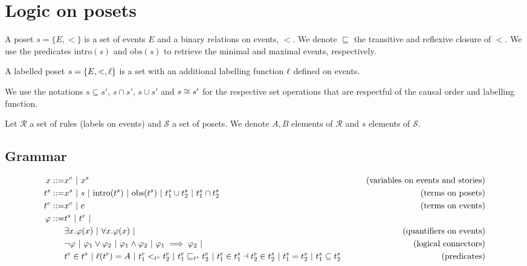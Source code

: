 \section{Logic on posets}

\begin{definition}[Poset]
  \label{def:poset}
  A poset $s=\{E,<\}$ is a set of events $E$ and a binary relations on events, $<$. We denote $\sqsubseteq$ the transitive and reflexive closure of $<$.
  We use the predicates $\text{intro}(s)$ and $\text{obs}(s)$ to retrieve the minimal and maximal events, respectively.

  A labelled poset $s=\{E,<,\ell\}$ is a set with an additional labelling function $\ell$ defined on events.
\end{definition}


We use the notations $s \subseteq s'$, $s\cap s'$, $s\cup s'$ and $s\cong s'$ for the respective set operations that are respectful of the causal order and labelling function.

Let $\mathcal{R}$ a set of rules (labels on events) and $\mathcal{S}$ a set of posets.
We denote $A,B$ elements of $\mathcal{R}$ and $s$ elements of $\mathcal{S}$.

\subsection{Grammar}

\begin{align*}
  x ::= & x^e ~|~ x^s & \tag{variables on events and stories} \\
  t^s ::= & x^s ~|~ s ~|~ \text{intro}(t^s) ~|~ \text{obs}(t^s) ~|~ t^s_1 \cup t^s_2 ~|~ t^s_1 \cap t^s_2 &\tag{terms on posets} \\
  t^e ::= & x^e ~|~ e & \tag{terms on events}
  \\
  \varphi ::= & t^s ~|~ t^e ~| \\
  & \exists x.\varphi(x) ~|~ \forall x.\varphi(x) ~|&\tag{quantifiers on events}\\
  & \neg \varphi ~|~ \varphi_1 \vee \varphi_2~|~\varphi_1 \wedge \varphi_2~|~\varphi_1 \implies \varphi_2~|&\tag{logical connectors}\\
  & t^e\in t^s ~|~ \ell(t^e) = A ~|~ t^e_1 <_{t^s} t^e_2 ~|~ t^e_1 \sqsubseteq_{t^s} t^e_2 ~|~ t^e_1\in t^s_1 \dashv t^e_2\in t^s_2~|~ t^s_1 = t^s_2 ~|~ t^s_1\subseteq t^s_2
  & \tag{predicates}\\
  \\
\end{align*}

